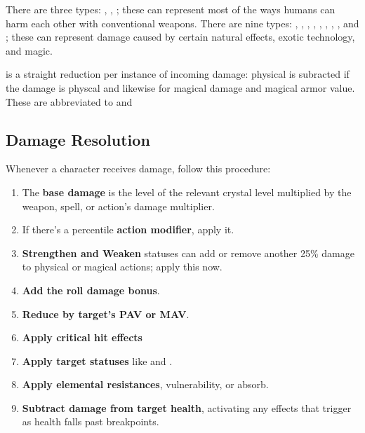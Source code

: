 \begin{multicols}{2}
        There are three  types: , , ; these can represent most of the ways humans can harm each other with conventional weapons. There are nine  types: , , , , , , , , and ;  these can represent damage caused by certain natural effects, exotic technology, and magic.

         is a straight reduction per instance of incoming damage: physical  is subracted if the damage is physcal and likewise for magical damage and magical armor value. These are abbreviated to  and 
        \clearpage
    \subsection{Damage Resolution}
        Whenever a character receives damage, follow this procedure:

        \begin{enumerate}
            \item The \textbf{base damage} is the level of the relevant crystal level multiplied by the weapon, spell, or action's damage multiplier.

            \item If there's a percentile \textbf{action modifier}, apply it.

            \item \textbf{Strengthen and Weaken} statuses can add or remove another 25\% damage to physical or magical actions; apply this now.

            \item \textbf{Add the roll damage bonus}.
            \item \textbf{Reduce by target's PAV or MAV}.        
            \item \textbf{Apply critical hit effects}
            \item \textbf{Apply target statuses} like  and .
            \item \textbf{Apply elemental resistances}, vulnerability, or absorb.
            \item \textbf{Subtract damage from target health}, activating any effects that trigger as health falls past breakpoints.
        \end{enumerate}


\end{multicols}
